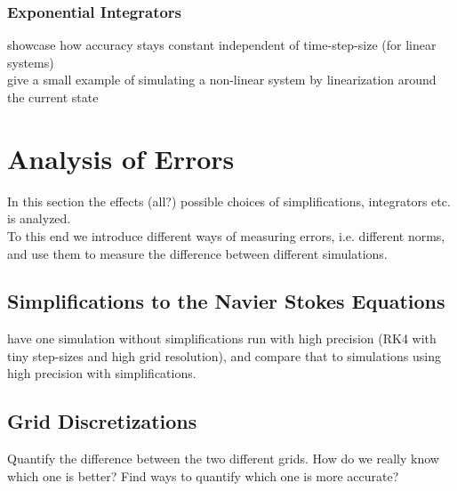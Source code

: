 \subsubsection{Exponential Integrators}
showcase how accuracy stays constant independent of time-step-size (for linear systems)\\
give a small example of simulating a non-linear system by linearization around the current state


\section{Analysis of Errors}
In this section the effects (all?) possible choices of simplifications, integrators etc. is analyzed.\\
To this end we introduce different ways of measuring errors, i.e. different norms, and use them to measure the difference between different simulations.

\subsection{Simplifications to the Navier Stokes Equations} %
have one simulation without simplifications run with high precision (RK4 with tiny step-sizes and high grid resolution), and compare that to simulations using high precision with simplifications.

\subsection{Grid Discretizations}%
Quantify the difference between the two different grids.
How do we really know which one is better?
Find ways to quantify which one is more accurate?